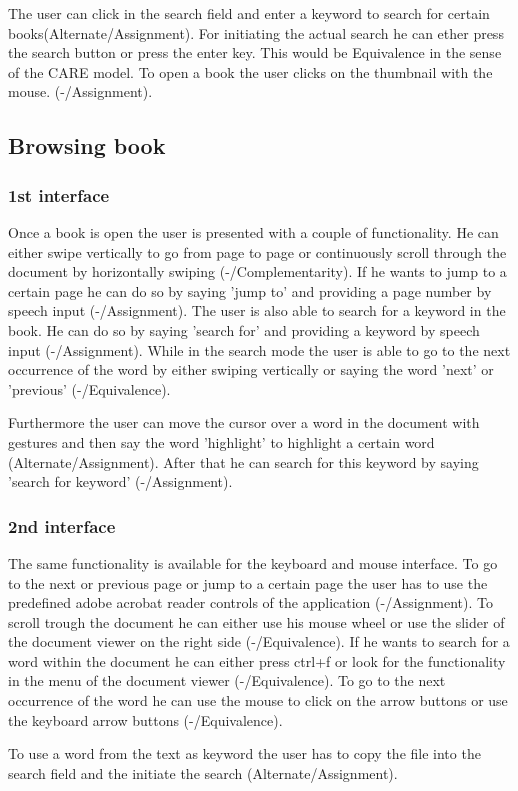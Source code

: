 \documentclass[a4paper, 10pt]{article}
\begin{document}
	\par{The user can click in the search field and enter a keyword to search for certain books(Alternate/Assignment). For initiating the actual search he can ether press the search button or press the enter key. This would be Equivalence in the sense of the CARE model. To open a book the user clicks on the thumbnail with the mouse. (-/Assignment).}
	
	\subsection{Browsing book}
	
	\subsubsection{1st interface}
	
	\par{Once a book is open the user is presented with a couple of functionality. He can either swipe vertically to go from page to page or continuously scroll through the document by horizontally swiping (-/Complementarity). If he wants to jump to a certain page he can do so by saying 'jump to' and providing a page number by speech input (-/Assignment). The user is also able to search for a keyword in the book. He can do so by saying 'search for' and providing a keyword by speech input (-/Assignment). While in the search mode the user is able to go to the next occurrence of the word by either swiping vertically or saying the word 'next' or 'previous' (-/Equivalence).}
	\par{Furthermore the user can move the cursor over a word in the document with gestures and then say the word 'highlight' to highlight a certain word (Alternate/Assignment). After that he can search for this keyword by saying 'search for keyword' (-/Assignment).  }
	
	\subsubsection{2nd interface}
	
	\par{The same functionality is available for the keyboard and mouse interface. To go to the next or previous page or jump to a certain page the user has to use the predefined adobe acrobat reader controls of the application (-/Assignment). To scroll trough the document he can either use his mouse wheel or use the slider of the document viewer on the right side (-/Equivalence). If he wants to search for a word within the document he can either press ctrl+f or look for the functionality in the menu of the document viewer (-/Equivalence). To go to the next occurrence of the word he can use the mouse to click on the arrow buttons or use the keyboard arrow buttons (-/Equivalence).}
	\par{To use a word from the text as keyword the user has to copy the file into the search field and the initiate the search (Alternate/Assignment).}
	
\end{document}
